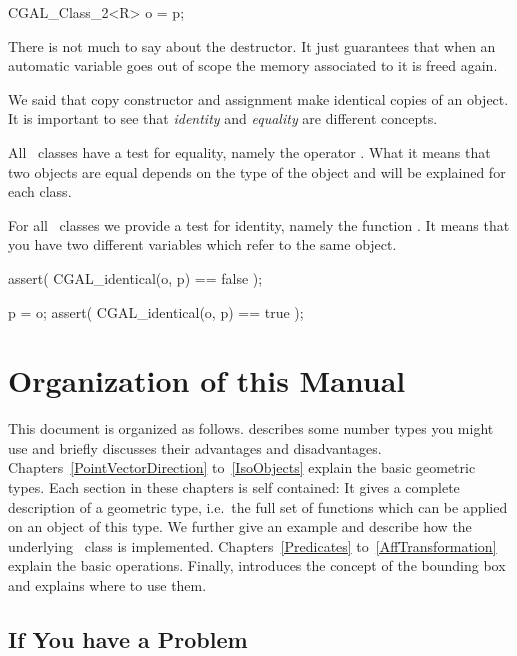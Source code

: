 \begin{cprog}

CGAL_Class_2<R>  o = p;
\end{cprog} 

\smallskip
There is not much to say about the destructor. It just guarantees
that when an automatic variable goes out of scope the memory associated
to it is freed again.

\medskip
We said that copy constructor and assignment make identical copies
of an object. It is important to see that {\em identity} and 
{\em equality} are different concepts. 


All \cgal\ classes have a test for equality, namely the
operator \CCstyle{==}.  What it means that two objects are
equal depends on the type of the object and will be explained 
for each class. 

For all \cgal\ classes we provide a test for identity, namely the
function . It means that you have two different
variables which refer to the same object.

\begin{cprog}

assert( CGAL_identical(o, p) == false );
  
p = o;
assert( CGAL_identical(o, p) == true );
\end{cprog} 

\section{Organization of this Manual}

This document is organized as follows. 
 describes some number types you might
use and briefly discusses their advantages and disadvantages.
Chapters~\ref{PointVectorDirection} to~\ref{IsoObjects} explain the
basic geometric types.  Each section in these chapters is self
contained: It gives a complete description of a geometric type, i.e.\
the full set of functions which can be applied on an object of this
type. We further give an example and describe how the underlying
\CC\ class is implemented.  Chapters~\ref{Predicates} 
to~\ref{AffTransformation} explain the basic operations.  Finally,
\Chapter{Bbox} introduces the concept of the bounding box and explains
where to use them.

\newpage
\subsection*{If You have a Problem}

